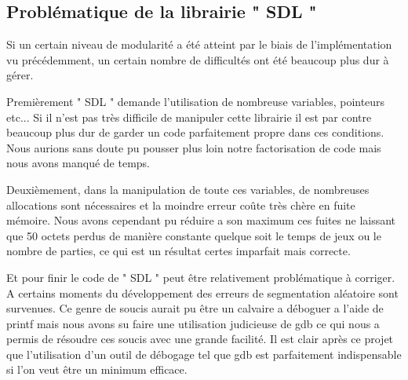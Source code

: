 \documentclass[12pt]{article}
\begin{document}
\subsection {Problématique de la librairie " SDL "}
Si un certain niveau de modularité a été atteint par le biais de l’implémentation vu
précédemment, un certain nombre de difficultés ont été beaucoup plus dur à gérer.
\par Premièrement " SDL " demande l'utilisation de nombreuse variables, pointeurs etc...
Si il n'est pas très difficile de manipuler cette librairie il est par contre beaucoup plus
dur de garder un code parfaitement propre dans ces conditions.
Nous aurions sans doute pu pousser plus loin notre factorisation de code mais nous
avons manqué de temps.
\par Deuxièmement, dans la manipulation de toute ces variables, de nombreuses allocations sont
nécessaires et la moindre erreur coûte très chère en fuite mémoire.
Nous avons cependant pu réduire a son maximum ces fuites ne laissant que 50 octets
perdus de manière constante quelque soit le temps de jeux ou le nombre de parties, ce qui est
un résultat certes imparfait mais correcte.
\par Et pour finir le code de " SDL " peut être relativement problématique à corriger. A certains
moments du développement des erreurs de segmentation aléatoire sont survenues.
Ce genre de soucis aurait pu être un calvaire a déboguer a l'aide de printf mais
nous avons su faire une utilisation judicieuse de gdb ce qui nous a permis de résoudre
ces soucis avec une grande facilité. Il est clair après ce projet que l'utilisation d'un outil de débogage
tel que gdb est parfaitement indispensable si l'on veut être un minimum efficace.


\newpage
\end{document}
